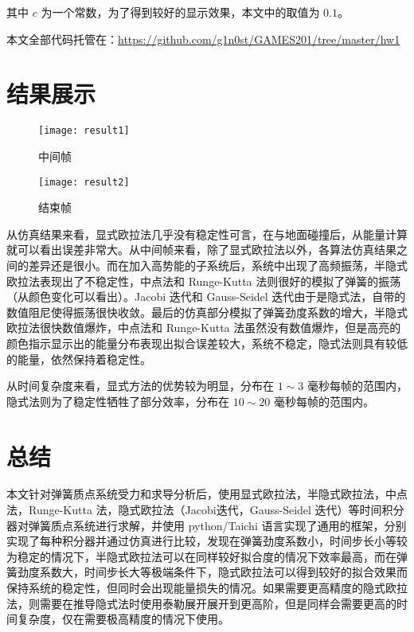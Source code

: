 \documentclass[UTF8]{ctexart}
\begin{document}
其中 $c$ 为一个常数，为了得到较好的显示效果，本文中的取值为 $0.1$。

本文全部代码托管在：\url{https://github.com/g1n0st/GAMES201/tree/master/hw1}

\section{结果展示}

\begin{figure}[H]
	\raggedleft
    \texttt{[image: result1]}
    \caption{中间帧}
    \label{Result.1}
\end{figure}

\begin{figure}[H]
	\raggedleft
    \texttt{[image: result2]}
    \caption{结束帧}
    \label{Result.2}
\end{figure}

从仿真结果来看，显式欧拉法几乎没有稳定性可言，在与地面碰撞后，从能量计算就可以看出误差非常大。从中间帧来看，除了显式欧拉法以外，各算法仿真结果之间的差异还是很小。而在加入高势能的子系统后，系统中出现了高频振荡，半隐式欧拉法表现出了不稳定性，中点法和 Runge-Kutta 法则很好的模拟了弹簧的振荡（从颜色变化可以看出）。Jacobi 迭代和 Gauss-Seidel 迭代由于是隐式法，自带的数值阻尼使得振荡很快收敛。最后的仿真部分模拟了弹簧劲度系数的增大，半隐式欧拉法很快数值爆炸，中点法和 Runge-Kutta 法虽然没有数值爆炸，但是高亮的颜色指示显示出的能量分布表现出拟合误差较大，系统不稳定，隐式法则具有较低的能量，依然保持着稳定性。

从时间复杂度来看，显式方法的优势较为明显，分布在 $1 \sim 3$ 毫秒每帧的范围内，隐式法则为了稳定性牺牲了部分效率，分布在 $10 \sim 20$ 毫秒每帧的范围内。

\section{总结}

本文针对弹簧质点系统受力和求导分析后，使用显式欧拉法，半隐式欧拉法，中点法，Runge-Kutta 法，隐式欧拉法（Jacobi迭代，Gauss-Seidel 迭代）等时间积分器对弹簧质点系统进行求解，并使用 python/Taichi 语言实现了通用的框架，分别实现了每种积分器并通过仿真进行比较，发现在弹簧劲度系数小，时间步长小等较为稳定的情况下，半隐式欧拉法可以在同样较好拟合度的情况下效率最高，而在弹簧劲度系数大，时间步长大等极端条件下，隐式欧拉法可以得到较好的拟合效果而保持系统的稳定性，但同时会出现能量损失的情况。如果需要更高精度的隐式欧拉法，则需要在推导隐式法时使用泰勒展开展开到更高阶，但是同样会需要更高的时间复杂度，仅在需要极高精度的情况下使用。
\end{document}
